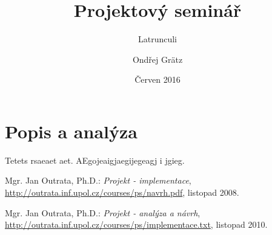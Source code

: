 \documentclass[12pt]{article}
\title{Projektový seminář}
\subtitle{Latrunculi}
\author{Ondřej Grätz}
\date{Červen 2016}
\begin{document}
\maketitle

\newpage
\section{Popis a analýza}
Tetets rsaeaet aet.
AEgojeaigjaegijegeagj i jgieg.

\newpage
\begin{thebibliography}{10}

	
 Mgr. Jan Outrata, Ph.D.: \emph{Projekt - implementace},
 \url{http://outrata.inf.upol.cz/courses/ps/navrh.pdf},
			listopad 2008.

	
 Mgr. Jan Outrata, Ph.D.: \emph{Projekt - analýza a návrh},
 \url{http://outrata.inf.upol.cz/courses/ps/implementace.txt},
			listopad 2010.

\end{thebibliography} 
\end{document}
